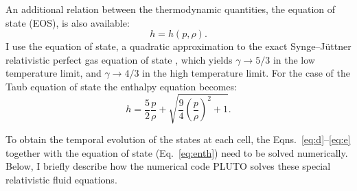 An additional relation between the thermodynamic quantities, the equation of state (EOS), is also available: 
\begin{equation}
h = h(p, \rho).
\label{eq:eos}
\end{equation}
I use the \citet{taub1948a} equation of state, a quadratic approximation to the exact Synge--J\"{u}ttner relativistic perfect gas equation of state \citep{juttner1911a,synge1957a}, which yields $\gamma\rightarrow5/3$ in the low temperature limit, and $\gamma\rightarrow4/3$ in the high temperature limit. For the case of the Taub equation of state the enthalpy equation becomes:
\begin{equation}
h = \frac{5}{2}\frac{p}{\rho} + \sqrt{\frac{9}{4} \left (\frac{p}{\rho} \right )^2 + 1}.
\label{eq:enth}
\end{equation}

To obtain the temporal evolution of the states at each cell, the Eqns.~\ref{eq:d}--\ref{eq:e} together with the equation of state (Eq.~\ref{eq:enth}) need to be solved numerically. Below, I briefly describe how the numerical code PLUTO solves these special relativistic fluid equations.




